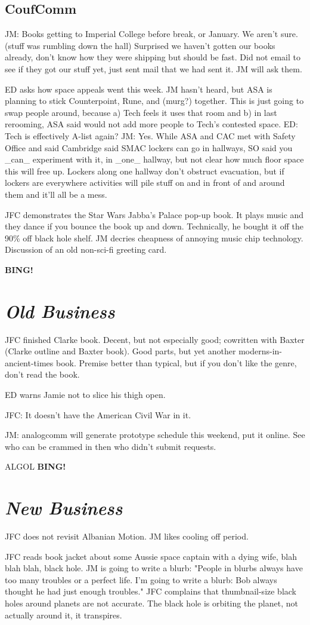 \documentclass[10pt]{article}
\newcommand{\bing}{{\bf BING!} }
\newcommand{\goto}[1]{\bing \vskip 12pt \section*{{\em{#1}}}}
\begin{document}
\subsection*{CoufComm}
JM: Books getting to Imperial College before break, or January.  We
aren't sure.  (stuff was rumbling down the hall) Surprised we haven't
gotten our books already, don't know how they were shipping but should
be fast.  Did not email to see if they got our stuff yet, just sent
mail that we had sent it.  JM will ask them.

ED asks how space appeals went this week.  JM hasn't heard, but ASA is
planning to stick Counterpoint, Rune, and (murg?) together.  This is
just going to swap people around, because a) Tech feels it uses that
room and b) in last rerooming, ASA said would not add more people to
Tech's contested space.  ED: Tech is effectively A-list again? JM:
Yes.  While ASA and CAC met with Safety Office and said Cambridge said
SMAC lockers can go in hallways, SO said you _can_ experiment with it,
in _one_ hallway, but not clear how much floor space this will free
up.  Lockers along one hallway don't obstruct evacuation, but if
lockers are everywhere activities will pile stuff on and in front of
and around them and it'll all be a mess.  

JFC demonstrates the Star Wars Jabba's Palace pop-up book.  It plays
music and they dance if you bounce the book up and down.  Technically,
he bought it off the 90\% off black hole shelf.  JM decries cheapness
of annoying music chip technology.  Discussion of an old non-sci-fi
greeting card.

\goto{Old Business}
JFC finished Clarke book.  Decent, but not especially good; cowritten
with Baxter (Clarke outline and Baxter book).  Good parts, but yet
another moderns-in-ancient-times book.  Premise better than typical,
but if you don't like the genre, don't read the book.

ED warns Jamie not to slice his thigh open.

JFC: It doesn't have the American Civil War in it.

JM: analogcomm will generate prototype schedule this weekend, put it
online.  See who can be crammed in then who didn't submit requests.


ALGOL
\goto{New Business}
JFC does not revisit Albanian Motion.  JM likes cooling off period.

JFC reads book jacket about some Aussie space captain with a dying
wife, blah blah blah, black hole.  JM is going to write a blurb:
"People in blurbs always have too many troubles or a perfect life.
I'm going to write a blurb: Bob always thought he had just enough
troubles."  JFC complains that thumbnail-size black holes around
planets are not accurate.  The black hole is orbiting the planet, not
actually around it, it transpires.
\end{document}
